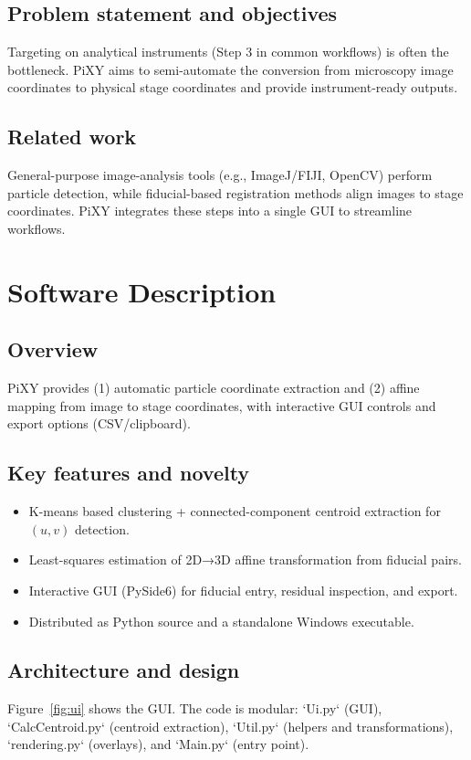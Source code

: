 \documentclass[preprint,12pt]{elsarticle}
\begin{document}
\subsection{Problem statement and objectives}
Targeting on analytical instruments (Step 3 in common workflows) is often the bottleneck. PiXY aims to semi-automate the conversion from microscopy image coordinates to physical stage coordinates and provide instrument-ready outputs.

\subsection{Related work}
General-purpose image-analysis tools (e.g., ImageJ/FIJI, OpenCV) perform particle detection, while fiducial-based registration methods align images to stage coordinates. PiXY integrates these steps into a single GUI to streamline workflows.

\section{Software Description}
\subsection{Overview}
PiXY provides (1) automatic particle coordinate extraction and (2) affine mapping from image to stage coordinates, with interactive GUI controls and export options (CSV/clipboard).

\subsection{Key features and novelty}
\begin{itemize}
  \item K-means based clustering + connected-component centroid extraction for $(u,v)$ detection.
  \item Least-squares estimation of 2D→3D affine transformation from fiducial pairs.
  \item Interactive GUI (PySide6) for fiducial entry, residual inspection, and export.
  \item Distributed as Python source and a standalone Windows executable.
\end{itemize}

\subsection{Architecture and design}
Figure~\ref{fig:ui} shows the GUI. The code is modular: `Ui.py` (GUI), `CalcCentroid.py` (centroid extraction), `Util.py` (helpers and transformations), `rendering.py` (overlays), and `Main.py` (entry point).
\end{document}
